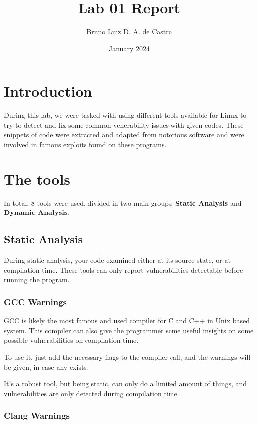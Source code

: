 \documentclass{article}
\title{Lab 01 Report}
\author{Bruno Luiz D. A. de Castro}
\date{January 2024}
\begin{document}
\maketitle

\section{Introduction}

During this lab, we were tasked with using different tools available for Linux to try to detect and fix some common venerability issues with given codes. These snippets of code were extracted and adapted from notorious software and were involved in famous exploits found on these programs.

\section{The tools}

In total, 8 tools were used, divided in two main groups: \textbf{Static Analysis} and \textbf{Dynamic Analysis}.

\subsection{Static Analysis}

During static analysis, your code examined either at its source state, or at compilation time. These tools can only report vulnerabilities detectable before running the program.

\subsubsection{GCC Warnings}

GCC is likely the most famous and used compiler for C and C++ in Unix based system. This compiler can also give the programmer some useful insights on some possible vulnerabilities on compilation time.

To use it, just add the necessary flags to the compiler call, and the warnings will be given, in case any exists.

It's a robust tool, but being static, can only do a limited amount of things, and vulnerabilities are only detected during compilation time.

\subsubsection{Clang Warnings}
\end{document}

